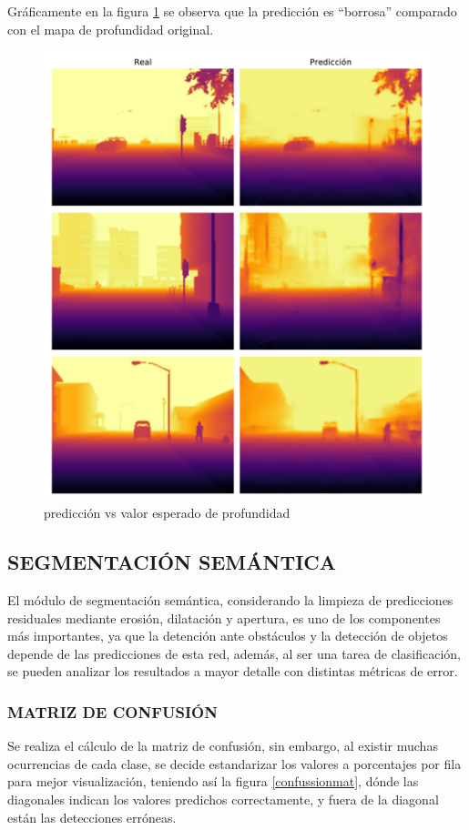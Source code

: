 	Gráficamente en la figura \ref{depthpred} se observa que la predicción es ``borrosa'' comparado con el mapa de profundidad original.
	
	\begin{figure}[H]
		\centering
		\includegraphics[scale=0.6]{imagenes/preds/depth}
		\caption[Predicción vs valor esperado de profundidad]{predicción vs valor esperado de profundidad}
		\label{depthpred}
	\end{figure}
	
\subsection{SEGMENTACIÓN SEMÁNTICA}
El módulo de segmentación semántica, considerando la limpieza de predicciones residuales mediante erosión, dilatación y apertura, es uno de los componentes más importantes, ya que la detención ante obstáculos y la detección de objetos depende de las predicciones de esta red, además, al ser una tarea de clasificación, se pueden analizar los resultados a mayor detalle con distintas métricas de error.
	\subsubsection{MATRIZ DE CONFUSIÓN}
	Se realiza el cálculo de la matriz de confusión, sin embargo, al existir muchas ocurrencias de cada clase, se decide estandarizar los valores a porcentajes por fila para mejor visualización, teniendo así la figura \ref{confussionmat}, dónde las diagonales indican los valores predichos correctamente, y fuera de la diagonal están las detecciones erróneas.
	
